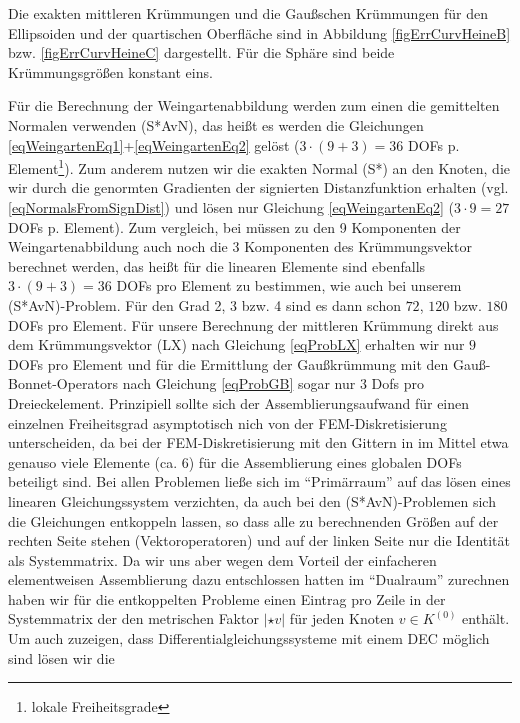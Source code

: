   Die exakten mittleren Krümmungen und die Gaußschen Krümmungen für den Ellipsoiden und der quartischen Oberfläche
  sind in Abbildung \ref{figErrCurvHeineB} bzw. \ref{figErrCurvHeineC} dargestellt.
  Für die Sphäre sind beide Krümmungsgrößen konstant eins.

  Für die Berechnung der Weingartenabbildung werden zum einen die gemittelten Normalen verwenden (S*AvN), das heißt es werden die
  Gleichungen \eqref{eqWeingartenEq1}+\eqref{eqWeingartenEq2} gelöst 
  (\( 3 \cdot (9+3) = 36 \) DOFs p. Element\footnote{lokale Freiheitsgrade}).
  Zum anderem nutzen wir die exakten Normal (S*) an den Knoten, die wir durch die genormten Gradienten der
  signierten Distanzfunktion erhalten (vgl. \eqref{eqNormalsFromSignDist})
  und lösen nur Gleichung \eqref{eqWeingartenEq2} (\( 3 \cdot 9 = 27 \) DOFs p. Element).
  Zum vergleich, bei \cite{heine} müssen zu den 9 Komponenten der Weingartenabbildung auch noch die 3 Komponenten des Krümmungsvektor
  berechnet werden, das heißt für die linearen Elemente sind ebenfalls \( 3 \cdot (9+3) = 36 \) DOFs pro Element zu bestimmen, wie auch bei
  unserem (S*AvN)-Problem. 
  Für den Grad 2, 3 bzw. 4 sind es dann schon \( 72 \), \( 120 \) bzw. \( 180 \) DOFs pro Element.
  Für unsere Berechnung der mittleren Krümmung direkt aus dem Krümmungsvektor (LX) nach Gleichung
  \eqref{eqProbLX} erhalten wir nur \( 9 \) DOFs pro Element
  und für die Ermittlung der Gaußkrümmung mit den Gauß-Bonnet-Operators nach Gleichung \eqref{eqProbGB}
  sogar nur \( 3 \) Dofs pro Dreieckelement.
  Prinzipiell sollte sich der Assemblierungsaufwand für einen einzelnen Freiheitsgrad asymptotisch nich von
  der FEM-Diskretisierung unterscheiden,
  da bei der FEM-Diskretisierung mit den Gittern in \cite{heine} im Mittel etwa genauso viele Elemente 
  (ca. 6) für die Assemblierung eines globalen DOFs beteiligt sind.
  Bei allen Problemen ließe sich im "`Primärraum"' auf das lösen eines linearen Gleichungssystem verzichten, 
  da auch bei den 
  (S*AvN)-Problemen sich die Gleichungen entkoppeln lassen, so dass alle zu berechnenden Größen auf
  der rechten Seite stehen (Vektoroperatoren) und auf der linken Seite nur die Identität als Systemmatrix.
  Da wir uns aber wegen dem Vorteil der einfacheren elementweisen Assemblierung dazu entschlossen hatten im
  "`Dualraum"' zurechnen haben wir für die entkoppelten Probleme einen Eintrag pro Zeile in der
  Systemmatrix der den metrischen Faktor \( \left| \star v \right| \) für jeden Knoten \( v\in K^{(0)} \)
  enthält. 
  Um auch zuzeigen, dass Differentialgleichungssysteme mit einem DEC möglich sind lösen wir die
